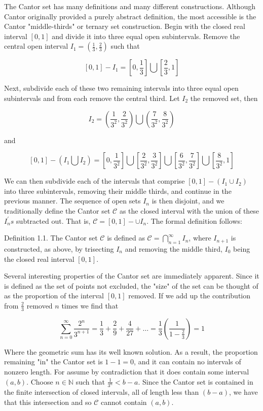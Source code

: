 \documentclass{article}
\begin{document}
\begin{itemize}
The Cantor set has many definitions and many different constructions. Although Cantor originally provided a purely abstract definition, the most accessible is the Cantor "middle-thirds" or ternary set construction. Begin with the closed real interval $[0,1]$ and divide it into three equal open subintervals. Remove the central open interval $I_{1}=\left(\frac{1}{3}, \frac{2}{3}\right)$ such that

$$
[0,1]-I_{1}=\left[0, \frac{1}{3}\right] \bigcup\left[\frac{2}{3}, 1\right]
$$

Next, subdivide each of these two remaining intervals into three equal open subintervals and from each remove the central third. Let $I_{2}$ the removed set, then

$$
I_{2}=\left(\frac{1}{3^{2}}, \frac{2}{3^{2}}\right) \bigcup\left(\frac{7}{3^{2}}, \frac{8}{3^{2}}\right)
$$

and

$$
[0,1]-\left(I_{1} \bigcup I_{2}\right)=\left[0, \frac{1}{3^{2}}\right] \bigcup\left[\frac{2}{3^{2}}, \frac{3}{3^{2}}\right] \bigcup\left[\frac{6}{3^{2}}, \frac{7}{3^{2}}\right] \bigcup\left[\frac{8}{3^{2}}, 1\right]
$$

We can then subdivide each of the intervals that comprise $[0,1]-\left(I_{1} \cup I_{2}\right)$ into three subintervals, removing their middle thirds, and continue in the previous manner. The sequence of open sets $I_{n}$ is then disjoint, and we traditionally define the Cantor set $\mathcal{C}$ as the closed interval with the union of these $I_{n}^{\prime} s$ subtracted out. That is, $\mathcal{C}=[0,1]-\cup I_{n}$. The formal definition follows:

Definition 1.1. The Cantor set $\mathcal{C}$ is defined as $\mathcal{C}=\bigcap_{n=1}^{\infty} I_{n}$, where $I_{n+1}$ is constructed, as above, by trisecting $I_{n}$ and removing the middle third, $I_{0}$ being the closed real interval $[0,1]$.

Several interesting properties of the Cantor set are immediately apparent. Since it is defined as the set of points not excluded, the "size" of the set can be thought of as the proportion of the interval $[0,1]$ removed. If we add up the contribution
from $\frac{2}{3}$ removed $n$ times we find that

$$
\sum_{n=0}^{\infty} \frac{2^{n}}{3^{n+1}}=\frac{1}{3}+\frac{2}{9}+\frac{4}{27}+\ldots=\frac{1}{3}\left(\frac{1}{1-\frac{2}{3}}\right)=1
$$

Where the geometric sum has its well known solution. As a result, the proportion remaining "in" the Cantor set is $1-1=0$, and it can contain no intervals of nonzero length. For assume by contradiction that it does contain some interval $(a, b)$. Choose $n \in \mathbb{N}$ such that $\frac{1}{3^{n}}<b-a$. Since the Cantor set is contained in the finite intersection of closed intervals, all of length less than $(b-a)$, we have that this intersection and so $\mathcal{C}$ cannot contain $(a, b)$.


\end{itemize}
\end{document}
